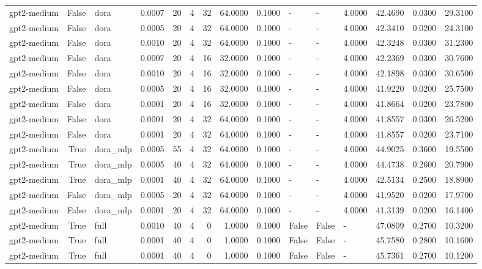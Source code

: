 \begin{tabular}{lrlrrrrrrlllrrr}
gpt2-medium & False & dora & 0.0007 & 20 & 4 & 32 & 64.0000 & 0.1000 & - & - & 4.0000 & 42.4690 & 0.0300 & 29.3100 \\
gpt2-medium & False & dora & 0.0005 & 20 & 4 & 32 & 64.0000 & 0.1000 & - & - & 4.0000 & 42.3410 & 0.0200 & 24.3100 \\
gpt2-medium & False & dora & 0.0010 & 20 & 4 & 32 & 64.0000 & 0.1000 & - & - & 4.0000 & 42.3248 & 0.0300 & 31.2300 \\
gpt2-medium & False & dora & 0.0007 & 20 & 4 & 16 & 32.0000 & 0.1000 & - & - & 4.0000 & 42.2369 & 0.0300 & 30.7600 \\
gpt2-medium & False & dora & 0.0010 & 20 & 4 & 16 & 32.0000 & 0.1000 & - & - & 4.0000 & 42.1898 & 0.0300 & 30.6500 \\
gpt2-medium & False & dora & 0.0005 & 20 & 4 & 16 & 32.0000 & 0.1000 & - & - & 4.0000 & 41.9220 & 0.0200 & 25.7500 \\
gpt2-medium & False & dora & 0.0001 & 20 & 4 & 16 & 32.0000 & 0.1000 & - & - & 4.0000 & 41.8664 & 0.0200 & 23.7800 \\
gpt2-medium & False & dora & 0.0001 & 20 & 4 & 32 & 64.0000 & 0.1000 & - & - & 4.0000 & 41.8557 & 0.0300 & 26.5200 \\
gpt2-medium & False & dora & 0.0001 & 20 & 4 & 32 & 64.0000 & 0.1000 & - & - & 4.0000 & 41.8557 & 0.0200 & 23.7100 \\
gpt2-medium & True & dora_mlp & 0.0005 & 55 & 4 & 32 & 64.0000 & 0.1000 & - & - & 4.0000 & 44.9025 & 0.3600 & 19.5500 \\
gpt2-medium & True & dora_mlp & 0.0005 & 40 & 4 & 32 & 64.0000 & 0.1000 & - & - & 4.0000 & 44.4738 & 0.2600 & 20.7900 \\
gpt2-medium & True & dora_mlp & 0.0001 & 40 & 4 & 32 & 64.0000 & 0.1000 & - & - & 4.0000 & 42.5134 & 0.2500 & 18.8900 \\
gpt2-medium & False & dora_mlp & 0.0005 & 20 & 4 & 32 & 64.0000 & 0.1000 & - & - & 4.0000 & 41.9520 & 0.0200 & 17.9700 \\
gpt2-medium & False & dora_mlp & 0.0001 & 20 & 4 & 32 & 64.0000 & 0.1000 & - & - & 4.0000 & 41.3139 & 0.0200 & 16.1400 \\
gpt2-medium & True & full & 0.0010 & 40 & 4 & 0 & 1.0000 & 0.1000 & False & False & - & 47.0809 & 0.2700 & 10.3200 \\
gpt2-medium & True & full & 0.0001 & 40 & 4 & 0 & 1.0000 & 0.1000 & False & False & - & 45.7580 & 0.2800 & 10.1600 \\
gpt2-medium & True & full & 0.0001 & 40 & 4 & 0 & 1.0000 & 0.1000 & False & False & - & 45.7361 & 0.2700 & 10.1200 \\

\end{tabular}
